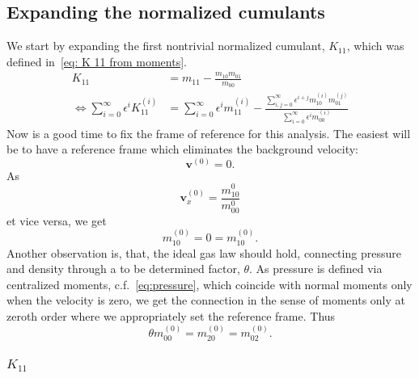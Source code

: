 \subsection{Expanding the normalized cumulants}
\label{sub:Expanding the normalized cumulants}
We start by expanding the first nontrivial normalized cumulant, $K_{11}$, which was defined in~\eqref{eq: K 11 from moments}.
\begin{equation}
  \begin{aligned}
    K_{11} & = m_{11} - \frac{m_{10}m_{01}}{m_{00}}\\
    \Leftrightarrow
    \sum_{i=0}^\infty \epsilon^i K_{11}^{(i)}
    & = \sum_{i=0}^\infty \epsilon^i m_{11}^{(i)} -
    \frac{\sum_{i,j=0}^\infty \epsilon^{i+j} m_{10}^{(i)}m_{01}^{(j)}}
         {\sum_{i=0}^\infty \epsilon^i m_{00}^{(i)}}
  \end{aligned}
\end{equation}
Now is a good time to fix the frame of reference for this analysis. The easiest will be to have a reference frame which eliminates the background velocity:
\begin{equation}
  \mathbf{v}^{(0)} = 0.
\end{equation}
As
\begin{equation}
  \mathbf{v}_x^{(0)} = \frac{m_{10}^{0}}{m_{00}^{0}}
\end{equation}
et vice versa, we get
\begin{equation}
  \label{eq: frame of reference}
  m_{10}^{(0)} = 0 = m_{10}^{(0)}.
\end{equation}
Another observation is, that, the ideal gas law should hold, connecting pressure and density through a to be determined factor, $\theta$. As pressure is defined via centralized moments, c.f.~\eqref{eq:pressure}, which coincide with normal moments only when the velocity is zero, we get the connection in the sense of moments only at zeroth order where we appropriately set the reference frame. Thus
\begin{equation}
  \label{eq: ideal gas}
  \theta m_{00}^{(0)} = m_{20}^{(0)} = m_{02}^{(0)}.
\end{equation}

\subsubsection{\texorpdfstring{$K_{11}$}{K 11}}
\label{subs:K 11}

